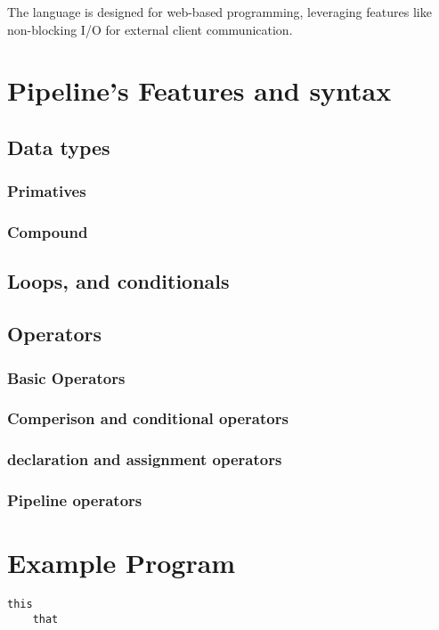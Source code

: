 \documentclass[11pt]{article}
\begin{document}
The language is designed for web-based programming, leveraging features like non-blocking I/O for external client communication. 

\section{Pipeline's Features and syntax}
\subsection{Data types}
\subsubsection{Primatives}
\subsubsection{Compound}
\subsection{Loops, and conditionals}
\subsection{Operators}
\subsubsection{Basic Operators}
\subsubsection{Comperison and conditional operators}
\subsubsection{declaration and assignment operators}
\subsubsection{Pipeline operators}


\section{Example Program}
\begin{lstlisting}
this
	that
\end{lstlisting}

\end{document}
